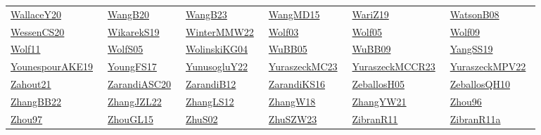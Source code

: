 \begin{longtable}{*{6}{l}}
\href{works/WallaceY20.pdf}{WallaceY20}~\cite{WallaceY20} & \href{works/WangB20.pdf}{WangB20}~\cite{WangB20} & \href{works/WangB23.pdf}{WangB23}~\cite{WangB23} & \href{works/WangMD15.pdf}{WangMD15}~\cite{WangMD15} & \href{}{WariZ19}~\cite{WariZ19} & \href{works/WatsonB08.pdf}{WatsonB08}~\cite{WatsonB08}\\ 
\href{works/WessenCS20.pdf}{WessenCS20}~\cite{WessenCS20} & \href{works/WikarekS19.pdf}{WikarekS19}~\cite{WikarekS19} & \href{works/WinterMMW22.pdf}{WinterMMW22}~\cite{WinterMMW22} & \href{works/Wolf03.pdf}{Wolf03}~\cite{Wolf03} & \href{works/Wolf05.pdf}{Wolf05}~\cite{Wolf05} & \href{works/Wolf09.pdf}{Wolf09}~\cite{Wolf09}\\ 
\href{works/Wolf11.pdf}{Wolf11}~\cite{Wolf11} & \href{works/WolfS05.pdf}{WolfS05}~\cite{WolfS05} & \href{works/WolinskiKG04.pdf}{WolinskiKG04}~\cite{WolinskiKG04} & \href{works/WuBB05.pdf}{WuBB05}~\cite{WuBB05} & \href{works/WuBB09.pdf}{WuBB09}~\cite{WuBB09} & \href{works/YangSS19.pdf}{YangSS19}~\cite{YangSS19}\\ 
\href{works/YounespourAKE19.pdf}{YounespourAKE19}~\cite{YounespourAKE19} & \href{works/YoungFS17.pdf}{YoungFS17}~\cite{YoungFS17} & \href{works/YunusogluY22.pdf}{YunusogluY22}~\cite{YunusogluY22} & \href{works/YuraszeckMC23.pdf}{YuraszeckMC23}~\cite{YuraszeckMC23} & \href{works/YuraszeckMCCR23.pdf}{YuraszeckMCCR23}~\cite{YuraszeckMCCR23} & \href{works/YuraszeckMPV22.pdf}{YuraszeckMPV22}~\cite{YuraszeckMPV22}\\ 
\href{works/Zahout21.pdf}{Zahout21}~\cite{Zahout21} & \href{works/ZarandiASC20.pdf}{ZarandiASC20}~\cite{ZarandiASC20} & \href{}{ZarandiB12}~\cite{ZarandiB12} & \href{works/ZarandiKS16.pdf}{ZarandiKS16}~\cite{ZarandiKS16} & \href{works/ZeballosH05.pdf}{ZeballosH05}~\cite{ZeballosH05} & \href{works/ZeballosQH10.pdf}{ZeballosQH10}~\cite{ZeballosQH10}\\ 
\href{works/ZhangBB22.pdf}{ZhangBB22}~\cite{ZhangBB22} & \href{works/ZhangJZL22.pdf}{ZhangJZL22}~\cite{ZhangJZL22} & \href{works/ZhangLS12.pdf}{ZhangLS12}~\cite{ZhangLS12} & \href{works/ZhangW18.pdf}{ZhangW18}~\cite{ZhangW18} & \href{works/ZhangYW21.pdf}{ZhangYW21}~\cite{ZhangYW21} & \href{works/Zhou96.pdf}{Zhou96}~\cite{Zhou96}\\ 
\href{works/Zhou97.pdf}{Zhou97}~\cite{Zhou97} & \href{works/ZhouGL15.pdf}{ZhouGL15}~\cite{ZhouGL15} & \href{works/ZhuS02.pdf}{ZhuS02}~\cite{ZhuS02} & \href{}{ZhuSZW23}~\cite{ZhuSZW23} & \href{works/ZibranR11.pdf}{ZibranR11}~\cite{ZibranR11} & \href{works/ZibranR11a.pdf}{ZibranR11a}~\cite{ZibranR11a}\\ 

\end{longtable}
